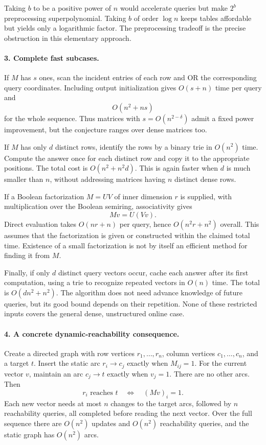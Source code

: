 \documentclass[11pt]{article}
\begin{document}
Taking $b$ to be a positive power of $n$ would accelerate queries but make $2^b$ preprocessing superpolynomial. Taking $b$ of order $\log n$ keeps tables affordable but yields only a logarithmic factor. The preprocessing tradeoff is the precise obstruction in this elementary approach.

\paragraph{3. Complete fast subcases.}
If $M$ has $s$ ones, scan the incident entries of each row and OR the corresponding query coordinates. Including output initialization gives $O(s+n)$ time per query and
\[
 O(n^2+ns)
\]
for the whole sequence. Thus matrices with $s=O(n^{2-\delta})$ admit a fixed power improvement, but the conjecture ranges over dense matrices too.

If $M$ has only $d$ distinct rows, identify the rows by a binary trie in $O(n^2)$ time. Compute the answer once for each distinct row and copy it to the appropriate positions. The total cost is $O(n^2+n^2d)$. This is again faster when $d$ is much smaller than $n$, without addressing matrices having $n$ distinct dense rows.

If a Boolean factorization $M=U V$ of inner dimension $r$ is supplied, with multiplication over the Boolean semiring, associativity gives
\[
 Mv=U(Vv).
\]
Direct evaluation takes $O(nr+n)$ per query, hence $O(n^2r+n^2)$ overall. This assumes that the factorization is given or constructed within the claimed total time. Existence of a small factorization is not by itself an efficient method for finding it from $M$.

Finally, if only $d$ distinct query vectors occur, cache each answer after its first computation, using a trie to recognize repeated vectors in $O(n)$ time. The total is $O(dn^2+n^2)$. The algorithm does not need advance knowledge of future queries, but its good bound depends on their repetition. None of these restricted inputs covers the general dense, unstructured online case.

\paragraph{4. A concrete dynamic-reachability consequence.}
Create a directed graph with row vertices $r_1,\ldots,r_n$, column vertices $c_1,\ldots,c_n$, and a target $t$. Insert the static arc $r_i\to c_j$ exactly when $M_{ij}=1$. For the current vector $v$, maintain an arc $c_j\to t$ exactly when $v_j=1$. There are no other arcs. Then
\[
 r_i\text{ reaches }t\quad\Longleftrightarrow\quad(Mv)_i=1.
\]
Each new vector needs at most $n$ changes to the target arcs, followed by $n$ reachability queries, all completed before reading the next vector. Over the full sequence there are $O(n^2)$ updates and $O(n^2)$ reachability queries, and the static graph has $O(n^2)$ arcs.
\end{document}
